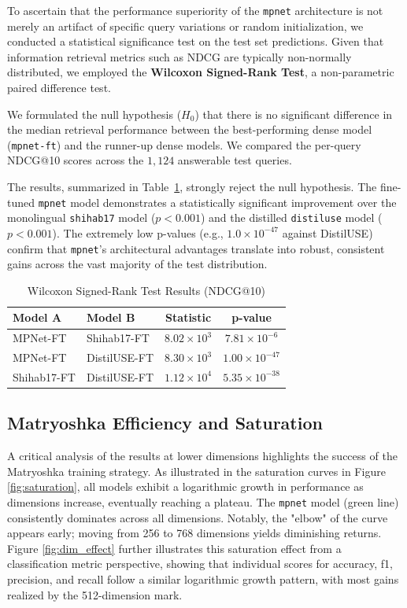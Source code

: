 \documentclass[manuscript,screen,review]{acmart}
\begin{document}
To ascertain that the performance superiority of the \texttt{mpnet} architecture is not merely an artifact of specific query variations or random initialization, we conducted a statistical significance test on the test set predictions. Given that information retrieval metrics such as NDCG are typically non-normally distributed, we employed the \textbf{Wilcoxon Signed-Rank Test}, a non-parametric paired difference test.

We formulated the null hypothesis ($H_0$) that there is no significant difference in the median retrieval performance between the best-performing dense model (\texttt{mpnet-ft}) and the runner-up dense models. We compared the per-query NDCG@10 scores across the $1,124$ answerable test queries.

The results, summarized in Table~\ref{tab:significance}, strongly reject the null hypothesis. The fine-tuned \texttt{mpnet} model demonstrates a statistically significant improvement over the monolingual \texttt{shihab17} model ($p < 0.001$) and the distilled \texttt{distiluse} model ($p < 0.001$). The extremely low p-values (e.g., $1.0 \times 10^{-47}$ against DistilUSE) confirm that \texttt{mpnet}'s architectural advantages translate into robust, consistent gains across the vast majority of the test distribution.

\begin{table}[htbp]
    \centering
    \caption{Wilcoxon Signed-Rank Test Results (NDCG@10)}
    \label{tab:significance}
    \begin{tabular}{llcc}
        \toprule
        \textbf{Model A} & \textbf{Model B} & \textbf{Statistic} & \textbf{p-value} \\
        \midrule
        MPNet-FT & Shihab17-FT & $8.02 \times 10^3$ & $7.81 \times 10^{-6}$ \\
        MPNet-FT & DistilUSE-FT & $8.30 \times 10^3$ & $1.00 \times 10^{-47}$ \\
        Shihab17-FT & DistilUSE-FT & $1.12 \times 10^4$ & $5.35 \times 10^{-38}$ \\
        \bottomrule
    \end{tabular}
\end{table}


\subsection{Matryoshka Efficiency and Saturation}
A critical analysis of the results at lower dimensions highlights the success of the Matryoshka training strategy. As illustrated in the saturation curves in Figure \ref{fig:saturation}, all models exhibit a logarithmic growth in performance as dimensions increase, eventually reaching a plateau. The \texttt{mpnet} model (green line) consistently dominates across all dimensions. Notably, the "elbow" of the curve appears early; moving from 256 to 768 dimensions yields diminishing returns. Figure \ref{fig:dim_effect} further illustrates this saturation effect from a classification metric perspective, showing that individual scores for accuracy, f1, precision, and recall follow a similar logarithmic growth pattern, with most gains realized by the 512-dimension mark.
\end{document}
